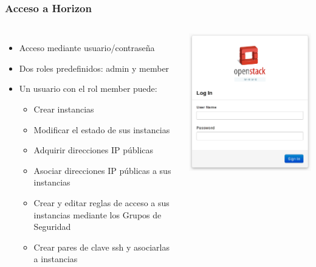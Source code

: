 \documentclass{beamer}
\begin{document}
\begin{frame}
  \frametitle{Acceso a Horizon}
  \begin{columns}
    \begin{itemize}
    \item Acceso mediante usuario/contraseña
    \item Dos roles predefinidos: admin y member
    \item Un usuario con el rol member puede:
      \begin{itemize}
      \item Crear instancias
      \item Modificar el estado de sus instancias
      \item Adquirir direcciones IP públicas
      \item Asociar direcciones IP públicas a sus instancias
      \item Crear y editar reglas de acceso a sus instancias mediante los Grupos de Seguridad
      \item Crear pares de clave ssh y asociarlas a instancias
      \end{itemize}
    \end{itemize}
    \includegraphics[width=\columnwidth]{../img/horizon1.png}
  \end{columns}
\end{frame}
\end{document}
